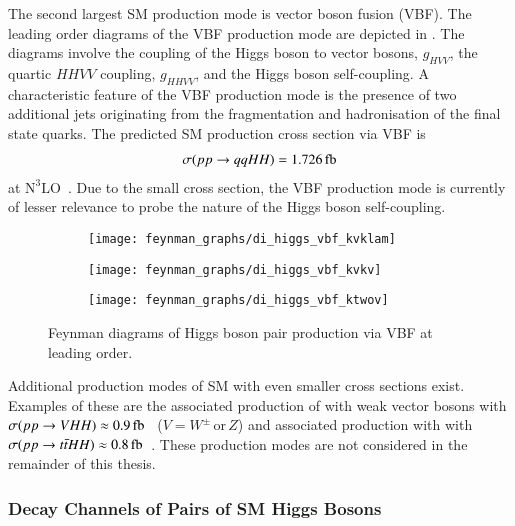 The second largest SM \HH production mode is vector boson fusion (VBF). The
leading order diagrams of the VBF production mode are depicted in
. The diagrams involve the coupling of the Higgs
boson to vector bosons, $g_{HVV}$, the quartic $HHVV$ coupling, $g_{HHVV}$, and
the Higgs boson self-coupling. A characteristic feature of the VBF production
mode is the presence of two additional jets originating from the fragmentation
and hadronisation of the final state quarks. The predicted SM \HH production
cross section via VBF is
\begin{align*}
  \sigma(\pp \to qqHH) = \SI{1.726}{\femto\barn}
\end{align*}
at $\text{N}^3\text{LO}$~\cite{Dreyer:2018qbw,LHCHWGHH}. Due to the small cross
section, the VBF production mode is currently of lesser relevance to probe the
nature of the Higgs boson self-coupling.

\begin{figure}[htbp]
  \centering

  \begin{subfigure}{0.33\textwidth}
    \centering
    \texttt{[image: feynman\_graphs/di\_higgs\_vbf\_kvklam]}
    \subcaption{}
  \end{subfigure}\hfill%
  \begin{subfigure}{0.33\textwidth}
    \centering
    \texttt{[image: feynman\_graphs/di\_higgs\_vbf\_kvkv]}
    \subcaption{}
  \end{subfigure}\hfill%
  \begin{subfigure}{0.33\textwidth}
    \centering
    \texttt{[image: feynman\_graphs/di\_higgs\_vbf\_ktwov]}
    \subcaption{}
  \end{subfigure}

  \caption{Feynman diagrams of Higgs boson pair production via VBF at leading
    order.}%
  \label{fig:dihiggs_vbf_feyn}
\end{figure}

Additional production modes of SM \HH with even smaller cross sections
exist. Examples of these are the associated production of \HH with weak vector
bosons with
$\sigma(\pp \to VHH) \approx \SI{0.9}{\femto\barn}$~\cite{deFlorian:2016spz}
($V = W^\pm\,\text{or}\,Z$) and associated production with \ttbar with
$\sigma(\pp \to \ttbar HH) \approx
\SI{0.8}{\femto\barn}$~\cite{deFlorian:2016spz}. These production modes are not
considered in the remainder of this thesis.


\subsubsection{Decay Channels of Pairs of SM Higgs Bosons}%

